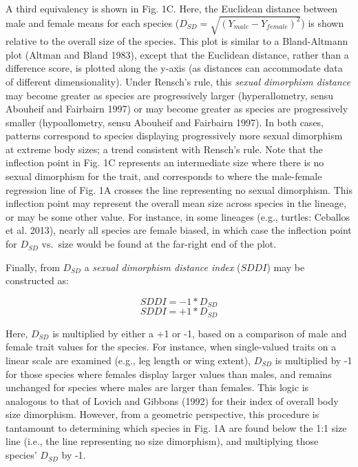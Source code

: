 \documentclass[]{article}
\begin{document}
A third equivalency is shown in Fig. 1C. Here, the Euclidean distance
between male and female means for each species
(\(D_{SD}=\sqrt{(Y_{male}-Y_{female})^2}\)) is shown relative to the
overall size of the species. This plot is similar to a Bland-Altmann
plot (Altman and Bland 1983), except that the Euclidean distance, rather
than a difference score, is plotted along the y-axis (as distances can
accommodate data of different dimensionality). Under Rensch's rule, this
\emph{sexual dimorphism distance} may become greater as species are
progressively larger (hyperallometry, sensu Abouheif and Fairbairn 1997)
or may become greater as species are progressively smaller
(hypoallometry, sensu Abouheif and Fairbairn 1997). In both cases,
patterns correspond to species displaying progressively more sexual
dimorphism at extreme body sizes; a trend consistent with Rensch's rule.
Note that the inflection point in Fig. 1C represents an intermediate
size where there is no sexual dimorphism for the trait, and corresponds
to where the male-female regression line of Fig. 1A crosses the line
representing no sexual dimorphism. This inflection point may represent
the overall mean size across species in the lineage, or may be some
other value. For instance, in some lineages (e.g., turtles: Ceballos et
al. 2013), nearly all species are female biased, in which case the
inflection point for \(D_{SD}\) vs.~size would be found at the far-right
end of the plot. \hfill\break

Finally, from \(D_{SD}\) a \emph{sexual dimorphism distance index}
(\(SDDI\)) may be constructed as:

\[SDDI=-1*D_{SD}\] \[SDDI=+1*D_{SD}\]

Here, \(D_{SD}\) is multiplied by either a +1 or -1, based on a
comparison of male and female trait values for the species. For
instance, when single-valued traits on a linear scale are examined
(e.g., leg length or wing extent), \(D_{SD}\) is multiplied by -1 for
those species where females display larger values than males, and
remains unchanged for species where males are larger than females. This
logic is analogous to that of Lovich and Gibbons (1992) for their index
of overall body size dimorphism. However, from a geometric perspective,
this procedure is tantamount to determining which species in Fig. 1A are
found below the 1:1 size line (i.e., the line representing no size
dimorphism), and multiplying those species' \(D_{SD}\) by -1.
\hfill\break
\end{document}
